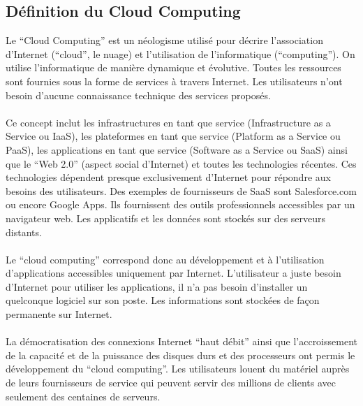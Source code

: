 \documentclass[a4paper,12pt]{report}
\begin{document}
\begin{onehalfspace}
	\section{Définition du Cloud Computing}
	
	Le “Cloud Computing” est un néologisme utilisé pour décrire l’association d’Internet (“cloud”, le nuage) et l’utilisation de l’informatique (“computing”). On utilise l’informatique de manière dynamique et évolutive. Toutes les ressources sont fournies sous la forme de services à travers Internet. Les utilisateurs n’ont besoin d’aucune connaissance technique des services proposés.

	\paragraph*{}
	Ce concept inclut les infrastructures en tant que service (Infrastructure as a Service ou IaaS), les plateformes en tant que service (Platform as a Service ou PaaS), les applications en tant que service (Software as a Service ou SaaS) ainsi que le “Web 2.0” (aspect social d’Internet) et toutes les technologies récentes. Ces technologies dépendent presque exclusivement d’Internet pour répondre aux besoins des utilisateurs. Des exemples de fournisseurs de SaaS sont Salesforce.com ou encore Google Apps. Ils fournissent des outils professionnels accessibles par un navigateur web. Les applicatifs et les données sont stockés sur des serveurs distants.
	
	\paragraph*{}
	Le “cloud computing” correspond donc au développement et à l’utilisation d’applications accessibles uniquement par Internet. L’utilisateur a juste besoin d’Internet pour utiliser les applications, il n’a pas besoin d’installer un quelconque logiciel sur son poste. Les informations sont stockées de façon permanente sur Internet.
	
	\paragraph*{}
	La démocratisation des connexions Internet “haut débit” ainsi que l'accroissement de la capacité et de la puissance des disques durs et des processeurs ont permis le développement du “cloud computing”. Les utilisateurs louent du matériel auprès de leurs fournisseurs de service qui peuvent servir des millions de clients avec seulement des centaines de serveurs.
	

\end{onehalfspace}
\end{document}

